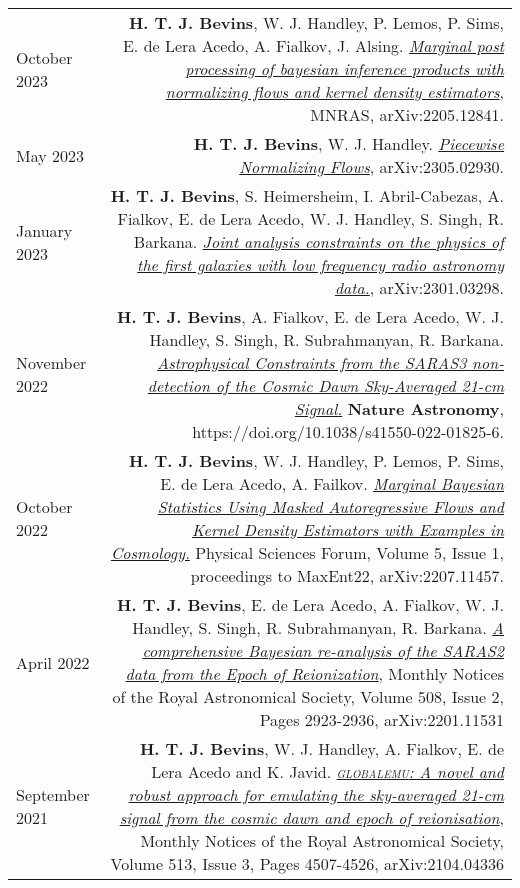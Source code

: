 \documentclass{article}
\begin{document}
\begin{tabular}{L!{\vrule}R}
    October 2023 & \textbf{H. T. J. Bevins}, W. J. Handley, P. Lemos, P. Sims, E. de Lera Acedo, A. Fialkov, J. Alsing. \href{https://arxiv.org/abs/2205.12841}{\textit{Marginal post processing of bayesian inference products with normalizing flows and kernel density estimators}}, MNRAS, arXiv:2205.12841. \\
    May 2023 & \textbf{H. T. J. Bevins}, W. J. Handley. \href{https://arxiv.org/abs/2305.02930}{\textit{Piecewise Normalizing Flows}}, arXiv:2305.02930. \\
    January 2023 & \textbf{H. T. J. Bevins}, S. Heimersheim, I. Abril-Cabezas, A. Fialkov, E. de Lera Acedo, W. J. Handley, S. Singh, R. Barkana. \href{https://arxiv.org/abs/2301.03298}{\textit{Joint analysis constraints on the physics of the first galaxies with low frequency radio astronomy data.}}, arXiv:2301.03298. \\
    November 2022 & \textbf{H. T. J. Bevins}, A. Fialkov, E. de Lera Acedo, W. J. Handley, S. Singh, R. Subrahmanyan, R. Barkana. \href{https://www.nature.com/articles/s41550-022-01825-6}{\textit{Astrophysical Constraints from the SARAS3 non-detection of the Cosmic Dawn Sky-Averaged 21-cm Signal.}} \textbf{Nature Astronomy}, https://doi.org/10.1038/s41550-022-01825-6.\\
	October 2022 & \textbf{H. T. J. Bevins}, W. J. Handley, P. Lemos, P. Sims, E. de Lera Acedo, A. Failkov. \href{https://www.mdpi.com/2673-9984/5/1/1#abstract}{\textit{Marginal Bayesian Statistics Using Masked Autoregressive Flows and Kernel Density Estimators with Examples in Cosmology.}} Physical Sciences Forum, Volume 5, Issue 1, proceedings to MaxEnt22, arXiv:2207.11457. \\
	April 2022 & \textbf{H. T. J. Bevins}, E. de Lera Acedo, A. Fialkov, W. J. Handley, S. Singh, R. Subrahmanyan, R. Barkana. \href{https://doi.org/10.1093/mnras/stac1158}{\textit{A comprehensive Bayesian re-analysis of the SARAS2 data from the Epoch of Reionization}}, Monthly Notices of the Royal Astronomical Society, Volume 508, Issue 2, Pages 2923-2936, arXiv:2201.11531\\
	September 2021 & \textbf{H. T. J. Bevins}, W. J. Handley, A. Fialkov, E. de Lera Acedo and K. Javid. \href{https://doi.org/10.1093/mnras/stab2737}{\textit{\textsc{globalemu}: A novel and robust approach for emulating the sky-averaged 21-cm signal from the cosmic dawn and epoch of reionisation}}, Monthly Notices of the Royal Astronomical Society, Volume 513, Issue 3, Pages 4507-4526, arXiv:2104.04336 \\

\end{tabular}
\end{document}
